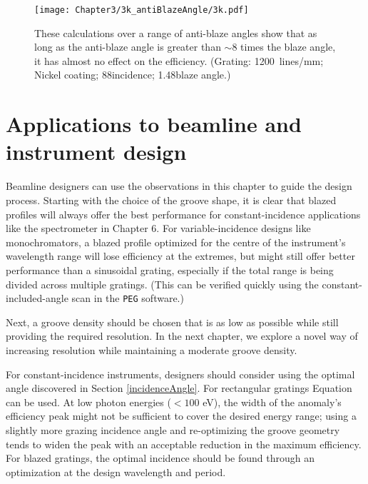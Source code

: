 \begin{figure}[htbp] %
   \centering
   \texttt{[image: Chapter3/3k\_antiBlazeAngle/3k.pdf]} 
   \caption[These calculations over a range of anti-blaze angles show that as long as the anti-blaze angle is greater than $\sim$4 times the blaze angle, it has almost no effect on the efficiency.]{These calculations over a range of anti-blaze angles show that as long as the anti-blaze angle is greater than $\sim$8 times the blaze angle, it has almost no effect on the efficiency.  (Grating: 1200~lines/mm; Nickel coating; 88\dg incidence; 1.48\dg blaze angle.)}
   \label{3k}
\end{figure}
	
\section{Applications to beamline and instrument design}
Beamline designers can use the observations in this chapter to guide the design process.  Starting with the choice of the groove shape, it is clear that blazed profiles will always offer the best performance for constant-incidence applications like the spectrometer in Chapter 6.  For variable-incidence designs like monochromators, a blazed profile optimized for the centre of the instrument's wavelength range will lose efficiency at the extremes, but might still offer better performance than a sinusoidal grating, especially if the total range is being divided across multiple gratings. (This can be verified quickly using the constant-included-angle scan in the \texttt{PEG} software.)

Next, a groove density should be chosen that is as low as possible while still providing the required resolution.  In the next chapter, we explore a novel way of increasing resolution while maintaining a moderate groove density.

For constant-incidence instruments, designers should consider using the optimal angle discovered in Section \ref{incidenceAngle}.  For rectangular gratings Equation  can be used. At low photon energies ($<100$ eV), the width of the anomaly's efficiency peak might not be sufficient to cover the desired energy range; using a slightly more grazing incidence angle and re-optimizing the groove geometry tends to widen the peak with an acceptable reduction in the maximum efficiency.
For blazed gratings, the optimal incidence should be found through an optimization at the design wavelength and period.  

